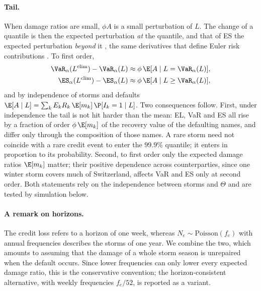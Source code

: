 \paragraph{Tail.}
When damage ratios are small, $\phi A$ is a small perturbation of $L$. The change of a quantile is then the expected perturbation \emph{at} the quantile, and that of ES the expected perturbation \emph{beyond} it \citep{Gourieroux00}, the same derivatives that define Euler risk contributions \citep[Sect.~6.3]{McNeil05}. To first order,
\begin{equation}
\label{eq:firstorder}
\begin{aligned}
\VaR_\alpha(L^{\mathrm{clim}})-\VaR_\alpha(L)&\approx\phi\,\E[A\mid L=\VaR_\alpha(L)],\\
\ES_\alpha(L^{\mathrm{clim}})-\ES_\alpha(L)&\approx\phi\,\E[A\mid L\ge\VaR_\alpha(L)],
\end{aligned}
\end{equation}
and by independence of storms and defaults $\E[A\mid L]=\sum_kE_kR_k\,\E[m_k]\,\P[I_k=1\mid L]$. Two consequences follow. First, under independence the tail is not hit harder than the mean: EL, VaR and ES all rise by a fraction of order $\phi\,\E[m_k]$ of the recovery value of the defaulting names, and differ only through the composition of those names. A rare storm need not coincide with a rare credit event to enter the $99.9\%$ quantile; it enters in proportion to its probability. Second, to first order only the expected damage ratios $\E[m_k]$ matter; their positive dependence across counterparties, since one winter storm covers much of Switzerland, affects VaR and ES only at second order. Both statements rely on the independence between storms and $\Theta$ and are tested by simulation below.

\paragraph{A remark on horizons.}
The credit loss refers to a horizon of one week, whereas $N_e\sim\mathrm{Poisson}(f_e)$ with annual frequencies describes the storms of one year. We combine the two, which amounts to assuming that the damage of a whole storm season is unrepaired when the default occurs. Since lower frequencies can only lower every expected damage ratio, this is the conservative convention; the horizon-consistent alternative, with weekly frequencies $f_e/52$, is reported as a variant.


